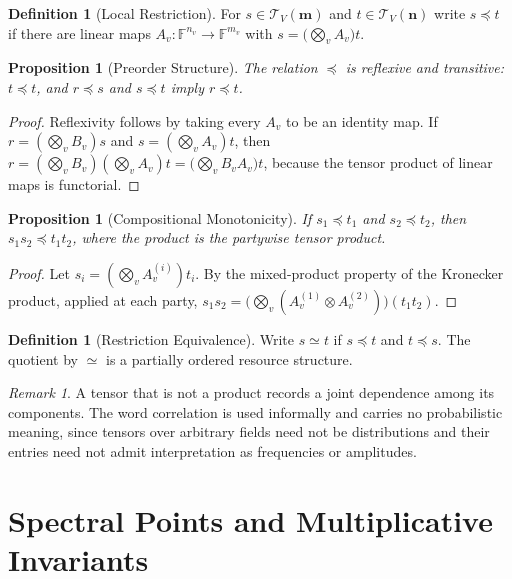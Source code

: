 \documentclass[11pt,letterpaper]{report}
\theoremstyle{plain}
\newtheorem{proposition}[theorem]{Proposition}
\theoremstyle{definition}
\newtheorem{definition}[theorem]{Definition}
\theoremstyle{remark}
\newtheorem{remark}[theorem]{Remark}
\begin{document}
\begin{definition}[Local Restriction]
For $s\in\mathcal T_V(\mathbf m)$ and $t\in\mathcal T_V(\mathbf n)$ write $s\preceq t$ if there are linear maps $A_v:\mathbb F^{n_v}\to\mathbb F^{m_v}$ with $s=\bigl(\bigotimes_vA_v\bigr)t$.
\end{definition}

\begin{proposition}[Preorder Structure]\label{pr:preorder}
The relation $\preceq$ is reflexive and transitive: $t\preceq t$, and $r\preceq s$ and $s\preceq t$ imply $r\preceq t$.
\end{proposition}
\begin{proof}
Reflexivity follows by taking every $A_v$ to be an identity map. If $r=(\bigotimes_vB_v)s$ and $s=(\bigotimes_vA_v)t$, then $r=(\bigotimes_vB_v)(\bigotimes_vA_v)t=\bigl(\bigotimes_vB_vA_v\bigr)t$, because the tensor product of linear maps is functorial.
\end{proof}

\begin{proposition}[Compositional Monotonicity]
If $s_1\preceq t_1$ and $s_2\preceq t_2$, then $s_1s_2\preceq t_1t_2$, where the product is the partywise tensor product.
\end{proposition}
\begin{proof}
Let $s_i=(\bigotimes_vA^{(i)}_v)t_i$. By the mixed-product property of the Kronecker product, applied at each party, $s_1s_2=\bigl(\bigotimes_v(A^{(1)}_v\otimes A^{(2)}_v)\bigr)(t_1t_2)$.
\end{proof}

\begin{definition}[Restriction Equivalence]
Write $s\simeq t$ if $s\preceq t$ and $t\preceq s$. The quotient by $\simeq$ is a partially ordered resource structure.
\end{definition}

\begin{remark}
A tensor that is not a product records a joint dependence among its components. The word correlation is used informally and carries no probabilistic meaning, since tensors over arbitrary fields need not be distributions and their entries need not admit interpretation as frequencies or amplitudes.
\end{remark}

\chapter{Spectral Points and Multiplicative Invariants}
\end{document}
